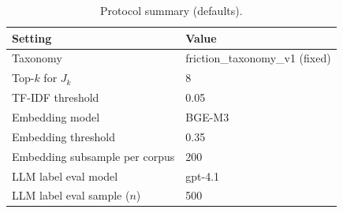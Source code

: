 \begin{table}[t]
\centering
\small
\caption{Protocol summary (defaults).}
\label{tab:run-contract}
\begin{tabular}{ll}
\toprule
Setting & Value \\
\midrule
Taxonomy & friction\_taxonomy\_v1 (fixed) \\
Top-$k$ for $J_k$ & 8 \\
TF-IDF threshold & 0.05 \\
Embedding model & BGE-M3 \\
Embedding threshold & 0.35 \\
Embedding subsample per corpus & 200 \\
LLM label eval model & gpt-4.1 \\
LLM label eval sample ($n$) & 500 \\
\bottomrule
\end{tabular}
\end{table}
